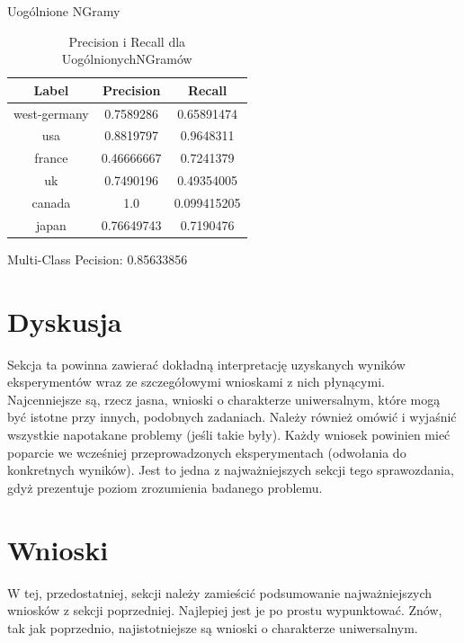 \documentclass{classrep}
\begin{document}
Uogólnione NGramy
\begin{table}[H]
\begin{tabular}{|c|c|c|}
\hline
Label        & Precision  & Recall      \\ \hline
west-germany & 0.7589286  & 0.65891474  \\ \hline
usa          & 0.8819797  & 0.9648311   \\ \hline
france       & 0.46666667 & 0.7241379   \\ \hline
uk           & 0.7490196  & 0.49354005  \\ \hline
canada       & 1.0        & 0.099415205 \\ \hline
japan        & 0.76649743 & 0.7190476   \\ \hline
\end{tabular}
\caption{Precision i Recall dla UogólnionychNGramów}
\end{table}
Multi-Class Pecision: 0.85633856

\section{Dyskusja}
{\color{blue}
Sekcja ta powinna zawierać dokładną interpretację uzyskanych wyników
eksperymentów wraz ze szczegółowymi wnioskami z nich płynącymi. Najcenniejsze
są, rzecz jasna, wnioski o charakterze uniwersalnym, które mogą być istotne
przy innych, podobnych zadaniach. Należy również omówić i wyjaśnić wszystkie
napotakane problemy (jeśli takie były). Każdy wniosek powinien mieć poparcie
we wcześniej przeprowadzonych eksperymentach (odwołania do konkretnych
wyników). Jest to jedna z najważniejszych sekcji tego sprawozdania, gdyż
prezentuje poziom zrozumienia badanego problemu.}

\section{Wnioski}
{\color{blue}W tej, przedostatniej, sekcji należy zamieścić podsumowanie
najważniejszych wniosków z sekcji poprzedniej. Najlepiej jest je po prostu
wypunktować. Znów, tak jak poprzednio, najistotniejsze są wnioski o
charakterze uniwersalnym.}
\end{document}
